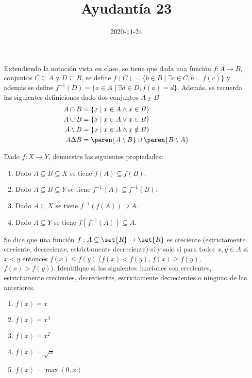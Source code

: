 \documentclass{ayudantia}
\title{Ayudantía 23}
\date{2020-11-24}
\begin{document}
\maketitle


Extendiendo la notación vista en clase, se tiene que dada una función \(f:A\rightarrow B\), conjuntos \(C\subseteq A\) y \(D\subseteq B\), se define \(f(C)=\{b\in B\mid \exists c\in C, b=f(c)\}\) y además se define \(f^{-1}(D)=\{a\in A\mid \exists d\in D, f(a)=d\}\). Además, se recuerda las siguientes definiciones dado dos conjuntos \(A\) y \(B\)
\begin{align*}
    A\cap B      & =\{x\mid x\in A\wedge x\in B\}                \\
    A\cup B      & =\{x\mid x\in A\vee x\in B\}                  \\
    A\setminus B & =\{x\mid x\in A\wedge x\notin B\}             \\
    A\Delta B    & =\paren{A\setminus B}\cup\paren{B\setminus A} \\
\end{align*}

\begin{prob}
    Dado \(f:X\rightarrow Y\), demuestre las siguientes propiedades:
    \begin{enumerate}
        \item Dado \(A\subseteq B\subseteq X\) se tiene \(f(A)\subseteq f(B)\).
        \item Dado \(A\subseteq B\subseteq Y\) se tiene \(f^{-1}(A)\subseteq f^{-1}(B)\).
        \item Dado \(A\subseteq X\) se tiene \(f^{-1}(f(A))\supseteq A\).
        \item Dado \(A\subseteq Y\) se tiene \(f(f^{-1}(A))\subseteq A\).
    \end{enumerate}
\end{prob}

\begin{ans}
    \begin{sol}

    \end{sol}
\end{ans}



\begin{prob}
    Se dice que una función \(f:A\subseteq\set{R}\rightarrow\set{R}\) es creciente (estrictamente creciente, decreciente, estrictamente decreciente) si y solo si para todos \(x,y\in A\) si \(x<y\) entonces \(f(x)\leq f(y)\) (\(f(x)<f(y)\), \(f(x)\geq f(y)\), \(f(x)>f(y)\)). Identifique si las siguientes funciones son crecientes, estrictamente crecientes, decrecientes, estrictamente decrecientes o ninguno de las anteriores.
    \begin{enumerate}
        \item \(f(x)=x\)
        \item \(f(x)=x^3\)
        \item \(f(x)=x^2\)
        \item \(f(x)=\sqrt{x}\)
        \item \(f(x)=\max(0,x)\)
    \end{enumerate}
\end{prob}
\end{document}
